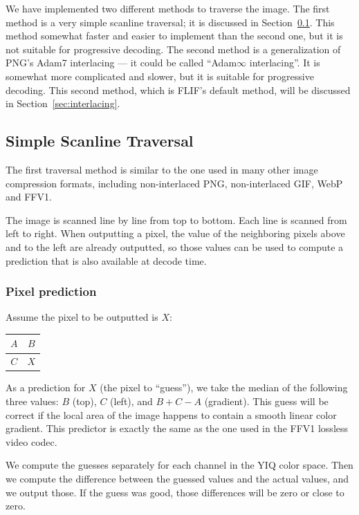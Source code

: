 \documentclass[a4paper,USenglish]{lipics}
\begin{document}
We have implemented two different methods to traverse the image.
The first method is a very simple scanline traversal; it is discussed in Section~\ref{sec:simple_traversal}.
This method somewhat faster and easier to implement than the second one, but it is not suitable for progressive decoding.
The second method is a generalization of PNG's Adam7 interlacing --- it could be called ``Adam$\infty$ interlacing''.
It is somewhat more complicated and slower, but it is suitable for progressive decoding.
This second method, which is FLIF's default method, will be discussed in Section~\ref{sec:interlacing}.

\subsection{Simple Scanline Traversal}
\label{sec:simple_traversal}

The first traversal method is similar to the one used in many other image compression formats, including
non-interlaced PNG, non-interlaced GIF, WebP and FFV1.

The image is scanned line by line from top to bottom. Each line is scanned from left to right.
When outputting a pixel, the value of the neighboring pixels above and to the left are already outputted,
so those values can be used to compute a prediction that is also available at decode time.

\subsubsection{Pixel prediction}
Assume the pixel to be outputted is $X$:
\begin{center}
\begin{tabular}{|c|c|}
\hline
$A$ & $B$ \\
\hline
$C$ & $X$ \\
\hline
\end{tabular}
\end{center}
As a prediction for $X$ (the pixel to ``guess''), we take the median of the following three values:
$B$ (top), $C$ (left), and $B+C-A$ (gradient). This guess will be correct if the local area
of the image happens to contain a smooth linear color gradient. This predictor is exactly the same as the one
used in the FFV1 lossless video codec.

We compute the guesses separately for each channel in the YIQ color space.
Then we compute the difference between the guessed values and the actual values,
and we output those. If the guess was good, those differences will be zero or close to zero.
\end{document}
